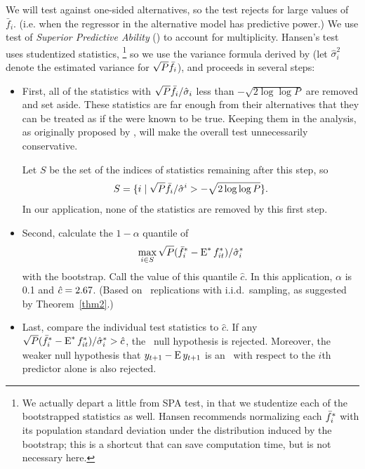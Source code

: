 \documentclass[12pt,fleqn]{article}
\begin{document}
We will test against one-sided alternatives, so the test rejects for
large values of $\bar f_i$. (i.e. when the regressor in the
alternative model has predictive power.)  We use  test
of \emph{Superior Predictive Ability} (\spa) to account for
multiplicity. Hansen's test uses studentized statistics,%
\footnote{We actually depart a little from  SPA test,
  in that we studentize each of the bootstrapped statistics as
  well. Hansen recommends normalizing each $\bar f_i^*$ with its
  population standard deviation under the distribution induced by the
  bootstrap; this is a shortcut that can save computation time, but is
  not necessary here.} %
so we use the variance formula derived by \citet{Cal:15} (let
$\hat\sigma_i^2$ denote the estimated variance for $\sqrt{P}\bar f_i$),
and proceeds in several steps:
\begin{itemize}
\item First, all of the statistics with $\sqrt{P} \bar f_i /
  \hat\sigma_i$ less than $-\sqrt{2 \log \log P}$ are removed and set
  aside. These statistics are far enough from their alternatives that
  they can be treated as if the were known to be true. Keeping them in
  the analysis, as originally proposed by \citet{Whi:00}, will make
  the overall test unnecessarily conservative.

  Let $S$ be the set of the indices of statistics remaining after this
  step, so
  \begin{equation*}
    S = \{i \mid \sqrt{P} \bar f_i / \hat\sigma^i > - \sqrt{2 \log \log P}\}.
  \end{equation*}
  In our application, none of the statistics are removed by this first
  step.
\item Second, calculate the $1 - \alpha$ quantile of
  \begin{equation*}
    \max_{i \in S} \sqrt{P} (\bar f_i^* - \operatorname{E}^* f_{it}^*) / \hat\sigma_i^*
  \end{equation*}
  with the bootstrap. Call the value of this quantile $\hat c$.  In
  this application, $\alpha$ is 0.1 and $\hat c =
  2.67$. (Based on \nboot\ replications with
  i.i.d.\ sampling, as suggested by Theorem~\ref{thm2}.)
\item Last, compare the individual test statistics to $\hat c$. If any
  $\sqrt{P} (\bar f_i^* - \operatorname{E}^* f_{it}^*) / \hat\sigma_i^* > \hat c$, the
  \mds\ null hypothesis is rejected. Moreover, the weaker null
  hypothesis that $y_{t+1} - \operatorname{E} y_{t+1}$ is an \mds\ with respect to
  the $i$th predictor alone is also rejected.
\end{itemize}
\end{document}
